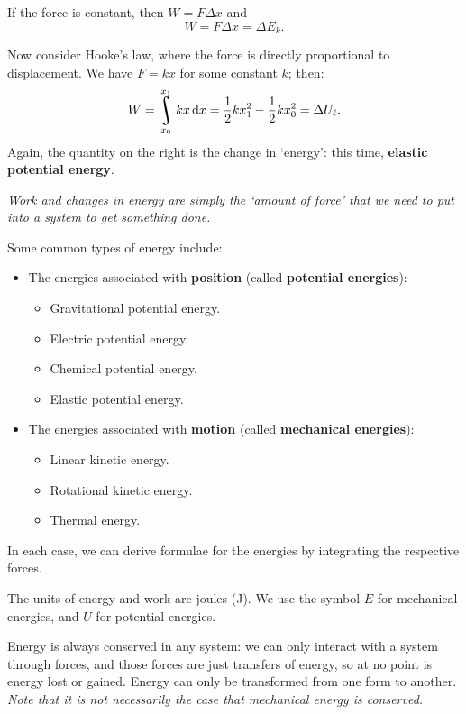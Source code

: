 \documentclass[a4paper]{amsbook}
\theoremstyle{definition}
\numberwithin{exercise}{chapter}
\numberwithin{exercise}{chapter}
\DeclareMathOperator*{\rint}{\scalerel*{\rotatebox{17}{$\!\int\!$}}{\int}}
\begin{document}
If the force is constant, then $ W = F\Delta x $ and
\begin{equation}
  W = F \Delta x = \Delta E_k.
\end{equation}

Now consider Hooke's law, where the force is directly proportional to displacement. We have $ F = kx $ for some constant $ k $; then:
\begin{equation}\label{eqn:elenergy}
  W = \rint_{x_0}^{x_1} kx \dif{x} = \frac{1}{2}kx_1^2 - \frac{1}{2}kx_0^2 = \Delta U_\ell.
\end{equation}
Again, the quantity on the right is the change in `energy': this time, \textbf{elastic potential energy}.

\emph{Work and changes in energy are simply the `amount of force' that we need to put into a system to get something done.}

Some common types of energy include:
\begin{itemize}
  \item The energies associated with \textbf{position} (called \textbf{potential energies}):
    \begin{itemize}
      \item Gravitational potential energy.
      \item Electric potential energy.
      \item Chemical potential energy.
      \item Elastic potential energy.
    \end{itemize}
  \item The energies associated with \textbf{motion} (called \textbf{mechanical energies}):
    \begin{itemize}
      \item Linear kinetic energy.
      \item Rotational kinetic energy.
      \item Thermal energy.
    \end{itemize}
\end{itemize}
In each case, we can derive formulae for the energies by integrating the respective forces.

The units of energy and work are joules (J). We use the symbol $ E $ for mechanical energies, and $ U $ for potential energies.

Energy is always conserved in any system: we can only interact with a system through forces, and those forces are just transfers of
energy, so at no point is energy lost or gained. Energy can only be transformed from one form to another. \emph{Note that it is
not necessarily the case that \emph{mechanical} energy is conserved.}
\end{document}
